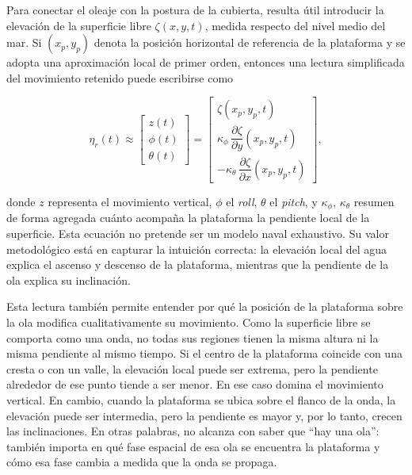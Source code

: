 \documentclass[12pt,a4paper]{report}
\begin{document}
Para conectar el oleaje con la postura de la cubierta, resulta útil introducir
la elevación de la superficie libre \(\zeta(x,y,t)\), medida respecto del nivel
medio del mar. Si \((x_p,y_p)\) denota la posición horizontal de referencia de
la plataforma y se adopta una aproximación local de primer orden, entonces una
lectura simplificada del movimiento retenido puede escribirse como

\begin{equation}
\eta_r(t) \approx
\begin{bmatrix}
z(t) \\
\phi(t) \\
\theta(t)
\end{bmatrix}
=
\begin{bmatrix}
\zeta(x_p,y_p,t) \\
\kappa_{\phi}\,\dfrac{\partial \zeta}{\partial y}(x_p,y_p,t) \\
-\kappa_{\theta}\,\dfrac{\partial \zeta}{\partial x}(x_p,y_p,t)
\end{bmatrix},
\label{eq:reduced_marine_state}
\end{equation}

donde \(z\) representa el movimiento vertical, \(\phi\) el \emph{roll},
\(\theta\) el \emph{pitch}, y \(\kappa_{\phi}\), \(\kappa_{\theta}\) resumen de
forma agregada cuánto acompaña la plataforma la pendiente local de la
superficie. Esta ecuación no pretende ser un modelo naval exhaustivo. Su valor
metodológico está en capturar la intuición correcta: la elevación local del agua
explica el ascenso y descenso de la plataforma, mientras que la pendiente de la
ola explica su inclinación.

Esta lectura también permite entender por qué la posición de la plataforma
sobre la ola modifica cualitativamente su movimiento. Como la superficie libre
se comporta como una onda, no todas sus regiones tienen la misma altura ni la
misma pendiente al mismo tiempo. Si el centro de la plataforma coincide con una
cresta o con un valle, la elevación local puede ser extrema, pero la pendiente
alrededor de ese punto tiende a ser menor. En ese caso domina el movimiento
vertical. En cambio, cuando la plataforma se ubica sobre el flanco de la onda,
la elevación puede ser intermedia, pero la pendiente es mayor y, por lo tanto,
crecen las inclinaciones. En otras palabras, no alcanza con saber que ``hay una
ola'': también importa en qué fase espacial de esa ola se encuentra la
plataforma y cómo esa fase cambia a medida que la onda se propaga.
\end{document}
